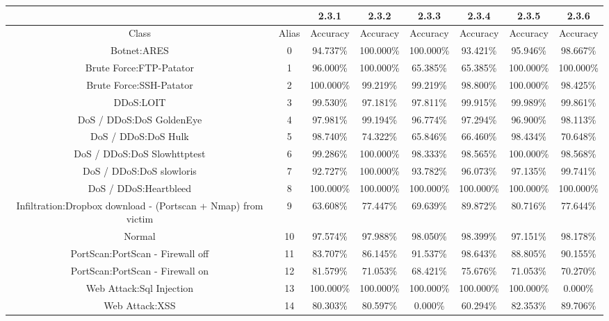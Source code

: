 \begin{table}[htb]
    \centering
    \begin{tabular}{@{}cccccccc@{}}
        \toprule
         &  & 2.3.1 & 2.3.2 & 2.3.3 & 2.3.4 & 2.3.5 & 2.3.6 \\
        \midrule
        Class &  Alias &  Accuracy &  Accuracy &  Accuracy &  Accuracy &  Accuracy &  Accuracy \\
        Botnet:ARES &  0 &  94.737\% &  100.000\% &  100.000\% &  93.421\% &  95.946\% &  98.667\% \\
        Brute Force:FTP-Patator &  1 &  96.000\% &  100.000\% &  65.385\% &  65.385\% &  100.000\% &  100.000\% \\
        Brute Force:SSH-Patator &  2 &  100.000\% &  99.219\% &  99.219\% &  98.800\% &  100.000\% &  98.425\% \\
        DDoS:LOIT &  3 &  99.530\% &  97.181\% &  97.811\% &  99.915\% &  99.989\% &  99.861\% \\
        DoS / DDoS:DoS GoldenEye &  4 &  97.981\% &  99.194\% &  96.774\% &  97.294\% &  96.900\% &  98.113\% \\
        DoS / DDoS:DoS Hulk &  5 &  98.740\% &  74.322\% &  65.846\% &  66.460\% &  98.434\% &  70.648\% \\
        DoS / DDoS:DoS Slowhttptest &  6 &  99.286\% &  100.000\% &  98.333\% &  98.565\% &  100.000\% &  98.568\% \\
        DoS / DDoS:DoS slowloris &  7 &  92.727\% &  100.000\% &  93.782\% &  96.073\% &  97.135\% &  99.741\% \\
        DoS / DDoS:Heartbleed &  8 &  100.000\% &  100.000\% &  100.000\% &  100.000\% &  100.000\% &  100.000\% \\
        Infiltration:Dropbox download - (Portscan + Nmap) from victim &  9 &  63.608\% &  77.447\% &  69.639\% &  89.872\% &  80.716\% &  77.644\% \\
        Normal &  10 &  97.574\% &  97.988\% &  98.050\% &  98.399\% &  97.151\% &  98.178\% \\
        PortScan:PortScan - Firewall off &  11 &  83.707\% &  86.145\% &  91.537\% &  98.643\% &  88.805\% &  90.155\% \\
        PortScan:PortScan - Firewall on &  12 &  81.579\% &  71.053\% &  68.421\% &  75.676\% &  71.053\% &  70.270\% \\
        Web Attack:Sql Injection &  13 &  100.000\% &  100.000\% &  100.000\% &  100.000\% &  100.000\% &  0.000\% \\
        Web Attack:XSS &  14 &  80.303\% &  80.597\% &  0.000\% &  60.294\% &  82.353\% &  89.706\% \\

\end{tabular}
\end{table}
